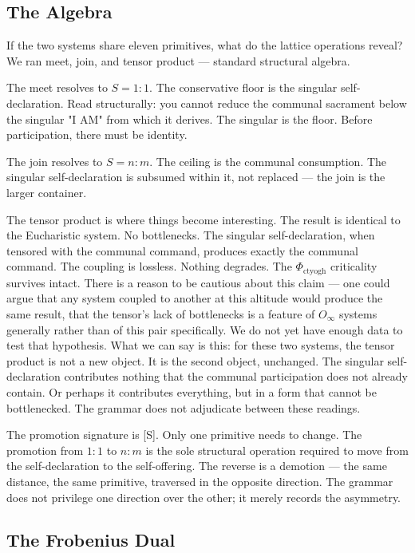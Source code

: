 \documentclass[12pt,a4paper]{article}
\begin{document}
\subsection{The Algebra}

If the two systems share eleven primitives, what do the lattice operations reveal? We ran meet, join, and tensor product --- standard structural algebra.

The meet resolves to $S = 1{:}1$. The conservative floor is the singular self-declaration. Read structurally: you cannot reduce the communal sacrament below the singular "I AM" from which it derives. The singular is the floor. Before participation, there must be identity.

The join resolves to $S = n{:}m$. The ceiling is the communal consumption. The singular self-declaration is subsumed within it, not replaced --- the join is the larger container.

The tensor product is where things become interesting. The result is identical to the Eucharistic system. No bottlenecks. The singular self-declaration, when tensored with the communal command, produces exactly the communal command. The coupling is lossless. Nothing degrades. The $\Phi_{\text{ctyogh}}$ criticality survives intact. There is a reason to be cautious about this claim --- one could argue that any system coupled to another at this altitude would produce the same result, that the tensor's lack of bottlenecks is a feature of $O_{\infty}$ systems generally rather than of this pair specifically. We do not yet have enough data to test that hypothesis. What we can say is this: for these two systems, the tensor product is not a new object. It is the second object, unchanged. The singular self-declaration contributes nothing that the communal participation does not already contain. Or perhaps it contributes everything, but in a form that cannot be bottlenecked. The grammar does not adjudicate between these readings.

The promotion signature is {[}S{]}. Only one primitive needs to change. The promotion from $1{:}1$ to $n{:}m$ is the sole structural operation required to move from the self-declaration to the self-offering. The reverse is a demotion --- the same distance, the same primitive, traversed in the opposite direction. The grammar does not privilege one direction over the other; it merely records the asymmetry.

\subsection{The Frobenius Dual}
\end{document}
